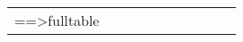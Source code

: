 \begin{center}
\begin{longtable}{llrrrrrrrr}
\endlastfoot
==>fulltable

\end{longtable}
\end{center}
